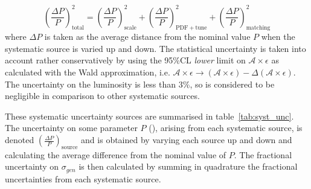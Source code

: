 \begin{equation}
\label{unc_P}
\left ( \frac{\Delta P}{P} \right )^2_{\mathrm{total}} = \left ( \frac{\Delta P}{P} \right )^2_{\mathrm{scale}} + \left ( \frac{\Delta P}{P} \right )^2_{\mathrm{PDF+tune}} + \left ( \frac{\Delta P}{P} \right )^2_{\mathrm{matching}}
\end{equation}
where $\Delta P$ is taken as the average distance from the nominal value $P$ when the systematic source is varied up and down. The statistical uncertainty is taken into account rather conservatively by using the 95\%CL \emph{lower} limit on $\mathcal{A} \times \epsilon$ as calculated with the Wald approximation, i.e. $\mathcal{A} \times \epsilon \rightarrow (\mathcal{A} \times \epsilon) - \Delta(\mathcal{A} \times \epsilon)$. The uncertainty on the luminosity is less than 3\%, so is considered to be negligible in comparison to other systematic sources.

\bigskip
\bigskip

\iffalse
{}

These systematic uncertainty sources are summarised in table~\ref{tab:syst_unc}. The uncertainty on some parameter $P$ (), arising from each systematic source, is denoted $\left ( \frac{\Delta P}{P} \right)_{\mathrm{source}}$ and is obtained by varying each source up and down and calculating the average difference from the nominal value of $P$. The fractional uncertainty on $\sigma_{gen}$ is then calculated by summing in quadrature the fractional uncertainties from each systematic source.



